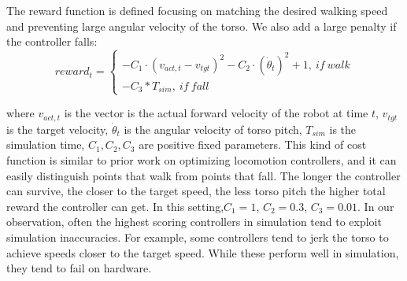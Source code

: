 The reward function is defined focusing on matching the desired walking speed and preventing large angular velocity of the torso. We also add a large penalty if the controller falls:
\begin{equation}
reward_t=\left\{
\begin{array}{rcl}
-C_1\cdot(v_{act, t}-v_{tgt})^2 -C_2\cdot(\dot{\theta}_t)^2 + 1 ,\  {if \ walk}\\
-C_3*T_{sim}, \  {if \ fall}
\end{array} \right.
\label{reward_1}
\end{equation}

where $v_{act, t}$ is the vector is the actual forward velocity of the robot at time $t$, $v_{tgt}$ is the target velocity, $\dot{\theta}_t$ is the angular velocity of torso pitch, $T_{sim}$ is the simulation time, $C_1,C_2,C_3$ are positive fixed parameters. This kind of cost function is similar to prior work on optimizing locomotion controllers, and it can easily distinguish points that walk from points that fall. The longer the controller can survive, the closer to the target speed, the less torso pitch the higher total reward the controller can get.
In this setting,$C_1 = 1$, $C_2=0.3$, $C_3=0.01$.
In our observation, often the highest scoring controllers in simulation tend to exploit simulation inaccuracies. For example, some controllers tend to jerk the torso to achieve speeds closer to the target speed. While these perform well in simulation, they tend to fail on hardware. 



